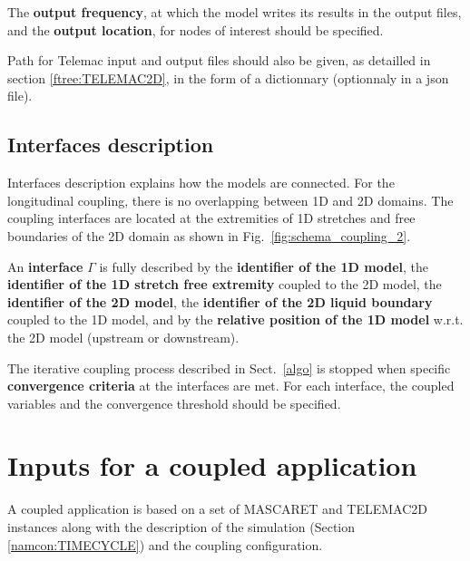 The {\bf output frequency}, at which the
model writes its results in the output files, and the {\bf output
  location}, for nodes of interest should be specified.

Path for Telemac input and output files should also be given,
as detailled in section \ref{ftree:TELEMAC2D}, in the form of a dictionnary (optionnaly in a json file).

\section{Interfaces description}\label{namcon:INTERF}
Interfaces description explains how the models are connected.
For the longitudinal coupling, there is no overlapping between 1D and 2D domains. The coupling interfaces are located
at the extremities of 1D stretches and free boundaries of the 2D
domain as shown in Fig.~\ref{fig:schema_coupling_2}.

An {\bf interface} $\Gamma$ is fully described by the {\bf
  identifier of the 1D model}, the {\bf identifier of the 1D stretch
free extremity} coupled to the 2D model, the {\bf
  identifier of the 2D model}, the {\bf identifier of the 2D liquid
boundary} coupled to the 1D model, and by the {\bf relative position
  of the 1D model} w.r.t. the 2D model (upstream or downstream).
\newline

The iterative coupling process described in Sect.~\ref{algo} is
stopped when specific {\bf convergence criteria} at the interfaces are
met. For each interface, the coupled variables and the convergence threshold should be specified.

\chapter{Inputs for a coupled application}\label{ftree}
A coupled application is based on a set of MASCARET and
TELEMAC2D instances along with the description of the simulation (Section
\ref{namcon:TIMECYCLE}) and the coupling configuration.
\newline

